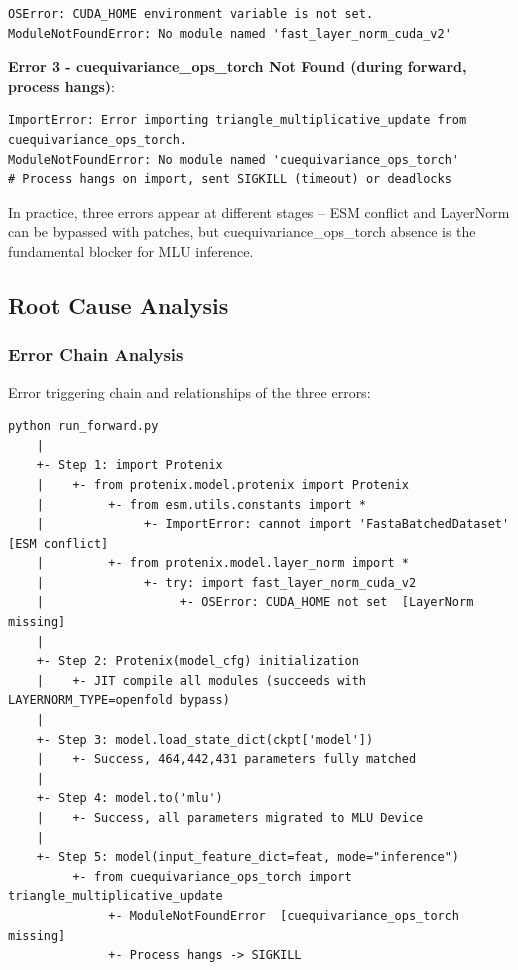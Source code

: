 \documentclass[12pt,a4paper]{article}
\begin{document}
\begin{verbatim}
OSError: CUDA_HOME environment variable is not set.
ModuleNotFoundError: No module named 'fast_layer_norm_cuda_v2'
\end{verbatim}

\textbf{Error 3 - cuequivariance_ops_torch Not Found (during forward, process hangs)}:

\begin{verbatim}
ImportError: Error importing triangle_multiplicative_update from cuequivariance_ops_torch.
ModuleNotFoundError: No module named 'cuequivariance_ops_torch'
# Process hangs on import, sent SIGKILL (timeout) or deadlocks
\end{verbatim}

In practice, three errors appear at different stages -- ESM conflict and LayerNorm can be bypassed with patches, but cuequivariance_ops_torch absence is the fundamental blocker for MLU inference.

\clearpage

\subsection{Root Cause Analysis}

\subsubsection{Error Chain Analysis}

Error triggering chain and relationships of the three errors:

\begin{verbatim}
python run_forward.py
    |
    +- Step 1: import Protenix
    |    +- from protenix.model.protenix import Protenix
    |         +- from esm.utils.constants import *
    |              +- ImportError: cannot import 'FastaBatchedDataset'  [ESM conflict]
    |         +- from protenix.model.layer_norm import *
    |              +- try: import fast_layer_norm_cuda_v2
    |                   +- OSError: CUDA_HOME not set  [LayerNorm missing]
    |
    +- Step 2: Protenix(model_cfg) initialization
    |    +- JIT compile all modules (succeeds with LAYERNORM_TYPE=openfold bypass)
    |
    +- Step 3: model.load_state_dict(ckpt['model'])
    |    +- Success, 464,442,431 parameters fully matched
    |
    +- Step 4: model.to('mlu')
    |    +- Success, all parameters migrated to MLU Device
    |
    +- Step 5: model(input_feature_dict=feat, mode="inference")
         +- from cuequivariance_ops_torch import triangle_multiplicative_update
              +- ModuleNotFoundError  [cuequivariance_ops_torch missing]
              +- Process hangs -> SIGKILL
\end{verbatim}
\end{document}
